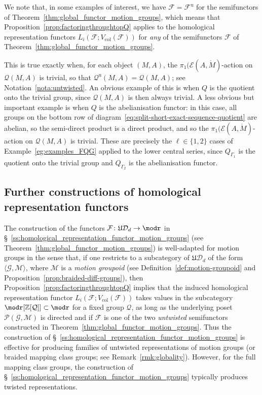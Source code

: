 \documentclass[AHL,Unicode,published]{cedram}
\newcommand{\Int}{\mathring}
\newcommand{\col}{\mathrm{col}}
\newcommand{\unt}{\mathrm{u}}
\newcommand{\LCS}{\varGamma}
\newcommand{\fU}{\ensuremath{\mathfrak{U}}}
\newcommand{\cD}{\mathcal{D}}
\newcommand{\cE}{\mathcal{E}}
\newcommand{\cF}{\mathcal{F}}
\newcommand{\cG}{\mathcal{G}}
\newcommand{\cM}{\mathcal{M}}
\newcommand{\cP}{\mathcal{P}}
\newcommand{\cQ}{\mathcal{Q}}
\newcommand{\bZ}{\mathbb{Z}}
\begin{document}
\begin{exam}\label{eg:LCS}
We note that, in some examples of interest, we have $\cF = \cF^{\unt}$ for the semifunctors of Theorem~\ref{thm:global_functor_motion_groups}, which means that Proposition~\ref{prop:factoringthroughtopQ} applies to the homological representation functors $L_i(\cF;V_{\col}(\cF))$ for \emph{any} of the semifunctors $\cF$ of Theorem~\ref{thm:global_functor_motion_groups}.

This is true exactly when, for each object $(M,A)$, the $\pi_{1}(\cE(A,\Int{M})$-action on $\cQ(M,A)$ is trivial, so that $\cQ^{\unt}(M,A) = \cQ(M,A)$; see Notation~\ref{nota:untwisted}. An obvious example of this is when $Q$ is the quotient onto the trivial group, since $\cQ(M,A)$ is then always trivial. A less obvious but important example is when $Q$ is the abelianisation functor: in this case, all groups on the bottom row of diagram~\eqref{eq:split-short-exact-sequence-quotient} are abelian, so the semi-direct product is a direct product, and so the $\pi_{1}(\cE(A,\Int{M})$-action on $\cQ(M,A)$ is trivial. These are precisely the $\ell\in\{1,2\}$ cases of Example~\ref{eg:examples_FQG} applied to the lower central series, since $Q_{\LCS_{1}}$ is the quotient onto the trivial group and $Q_{\LCS_{2}}$ is the abelianisation functor.
\end{exam}


\subsection{Further constructions of homological representation functors}\label{ss:homological_representation_functor_mcg}

The construction of the functors $\cF \colon \fU\cD_{d} \to \modr$ in \S~\ref{ss:homological_representation_functor_motion_groups} (see Theorem~\ref{thm:global_functor_motion_groups}) is well-adapted for motion groups in the sense that, if one restricts to a subcategory of $\fU\cD_{d}$ of the form $\langle \cG,\cM \rangle$, where $\cM$ is a \emph{motion groupoid} (see Definition~\ref{def:motion-groupoid} and Proposition~\ref{prop:braided-diff-groups}), then Proposition~\ref{prop:factoringthroughtopQ} implies that the induced homological representation functor $L_i(\cF;V_{\col}(\cF))$ takes values in the subcategory $\modr[\bZ[\cQ]] \subset \modr$ for a fixed group $\cQ$, as long as the underlying poset $\cP(\cG,\cM)$ is directed and if $\cF$ is one of the two \emph{untwisted} semifunctors constructed in Theorem~\ref{thm:global_functor_motion_groups}. Thus the construction of \S~\ref{ss:homological_representation_functor_motion_groups} is effective for producing families of untwisted representations of motion groups (or braided mapping class groups; see Remark~\ref{rmk:globality}). However, for the full mapping class groups, the construction of \S~\ref{ss:homological_representation_functor_motion_groups} typically produces twisted representations.
\end{document}
